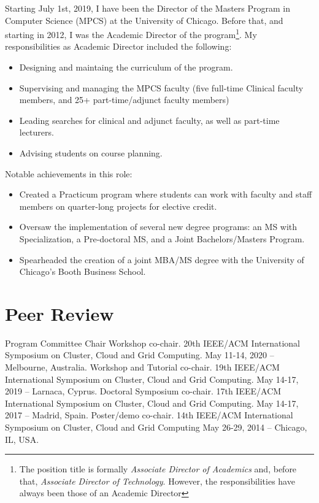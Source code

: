 \documentclass{resume}
\begin{document}
Starting July 1st, 2019, I have been the Director of the Masters Program in Computer Science (MPCS) at the University of Chicago. Before that, and starting in 2012, I was the Academic Director of the program\footnote{The position title is formally \emph{Associate Director of Academics} and, before that, \emph{Associate Director of Technology}. However, the responsibilities have always been those of an Academic Director}. My responsibilities as Academic Director included the following:

\begin{itemize}
 \item Designing and maintaing the curriculum of the program.
 \item Supervising and managing the MPCS faculty (five full-time Clinical faculty members, and 25+ part-time/adjunct faculty members)
 \item Leading searches for clinical and adjunct faculty, as well as part-time lecturers.
 \item Advising students on course planning.
\end{itemize}

\noindent Notable achievements in this role:

\begin{itemize}
 \item Created a Practicum program where students can work with faculty and staff members on quarter-long projects for elective credit.
 \item Oversaw the implementation of several new degree programs: an MS with Specialization, a Pre-doctoral MS, and a Joint Bachelors/Masters Program.
 \item Spearheaded the creation of a joint MBA/MS degree with the University of Chicago's Booth Business School.
\end{itemize}

\section*{\hspace{-1cm}Peer Review}

\begin{category}{Program Committee Chair}
\citembullet Workshop co-chair. 20th IEEE/ACM International Symposium on Cluster, Cloud and Grid Computing. May 11-14, 2020 -- Melbourne, Australia.
\citembullet Workshop and Tutorial co-chair. 19th IEEE/ACM International Symposium on Cluster, Cloud and Grid Computing. May 14-17, 2019 -- Larnaca, Cyprus.
\citembullet Doctoral Symposium co-chair. 17th IEEE/ACM International Symposium on Cluster, Cloud and Grid Computing. May 14-17, 2017 -- Madrid, Spain.
\citembullet Poster/demo co-chair. 14th IEEE/ACM International Symposium on Cluster, Cloud and Grid Computing
May 26-29, 2014 -- Chicago, IL, USA.
\end{category}
\end{document}
